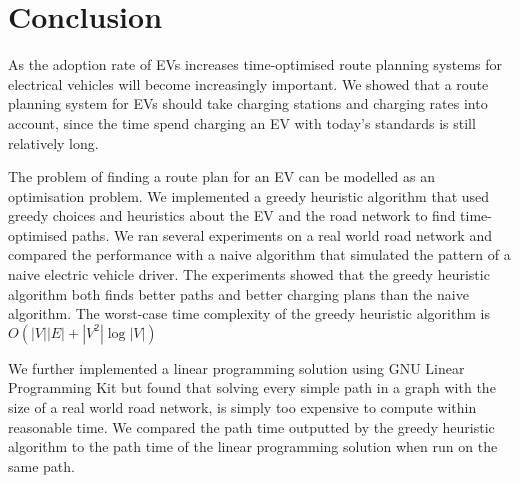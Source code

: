 \section{Conclusion}
\label{sec:conclusion}
As the adoption rate of EVs increases time-optimised route planning systems for electrical vehicles will become increasingly important. 
We showed that a route planning system for EVs should take charging stations and charging rates into account, since the time spend 
charging an EV with today's standards is still relatively long. 

The problem of finding a route plan for an EV can be modelled as an optimisation problem. We implemented a greedy heuristic algorithm that used greedy choices and heuristics about the EV and the road network to find time-optimised paths. We ran several experiments on a real world road network and compared the performance with a naive algorithm that simulated the pattern of a naive electric vehicle driver. The experiments showed that the greedy heuristic algorithm both finds better paths and better charging plans than the naive algorithm. The worst-case time complexity of the greedy heuristic algorithm is $O(|V||E|+|V^2|\log|V|)$

We further implemented a linear programming solution using GNU Linear Programming Kit but found that solving every simple path in a graph with the size of a real world road network, is simply too expensive to compute within reasonable time. We compared the path time outputted by the greedy heuristic algorithm to the path time of the linear programming solution when run on the same path. 
  